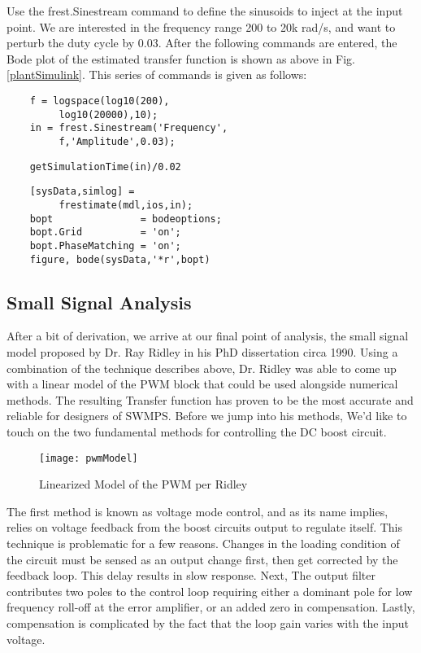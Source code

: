 Use the frest.Sinestream command to define the sinusoids to inject at the input point. We are interested in the frequency range 200 to 20k rad/s, and want to perturb the duty cycle by 0.03. After the following commands are entered, the Bode plot of the estimated transfer function is shown as above in Fig. \ref{plantSimulink}. This series of commands is given as follows:

\begin{verbatim}
	f = logspace(log10(200),
         log10(20000),10);
	in = frest.Sinestream('Frequency',
         f,'Amplitude',0.03);
\end{verbatim}

\begin{verbatim}
	getSimulationTime(in)/0.02
\end{verbatim}

\begin{verbatim}
	[sysData,simlog] = 
         frestimate(mdl,ios,in);
	bopt               = bodeoptions;
	bopt.Grid          = 'on';
	bopt.PhaseMatching = 'on';
	figure, bode(sysData,'*r',bopt)
\end{verbatim}

\subsection{Small Signal Analysis}
After a bit of derivation, we arrive at our final point of analysis, the small signal model proposed by Dr. Ray Ridley in his PhD dissertation circa 1990. Using a combination of the technique describes above, Dr. Ridley was able to come up with a linear model of the PWM block that could be used alongside numerical methods. The resulting Transfer function has proven to be the most accurate and reliable for designers of SWMPS. Before we jump into his methods, We'd like to touch on the two fundamental methods for controlling the DC boost circuit.
 
\begin{figure}[htbp]
\begin{center}
\texttt{[image: pwmModel]}
\caption{Linearized Model of the PWM per Ridley\cite{ridley}}
\label{pwmModel}
\end{center}
\end{figure}

The first method is known as voltage mode control, and as its name implies, relies on voltage feedback from the boost circuits output to regulate itself. This technique is problematic for a few reasons. Changes in the loading condition of the circuit must be sensed as an output change first, then get corrected by the feedback loop. This delay results in slow response. Next, The output filter contributes two poles to the control loop requiring either a dominant pole for low frequency roll-off at the error amplifier, or an added zero in compensation.
Lastly, compensation is complicated by the fact that the loop gain varies with the input voltage.

